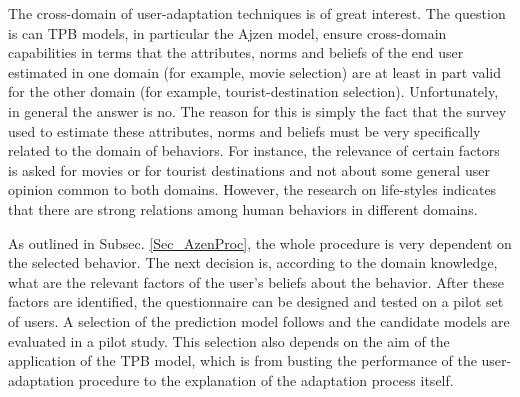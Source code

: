 \documentclass{llncs}
\begin{document}
\vspace{0.6em}
 The cross-domain of user-adaptation techniques is of great interest. The question is can TPB models, in particular the Ajzen model, ensure cross-domain capabilities in terms that the attributes, norms and beliefs of the end user estimated in one domain (for example, movie selection) are at least in part valid for the other domain (for example, tourist-destination selection). Unfortunately, in general the answer is no. The reason for this is simply the fact that the survey used to estimate these attributes, norms and beliefs must be very specifically related to the domain of behaviors. For instance, the relevance of certain factors is asked for movies or for tourist destinations and not about some general user opinion common to both domains. However, the research on life-styles \cite{Stadtmueller2013} \cite{Dewberry2013} indicates that there are strong relations among human behaviors in different domains.

\vspace{0.6em}
 As outlined in Subsec. \ref{Sec_AzenProc}, the whole procedure is very dependent on the selected behavior. The next decision is, according to the domain knowledge, what are the relevant factors of the user’s beliefs about the behavior. After these factors are identified, the questionnaire can be designed and tested on a pilot set of users. A selection of the prediction model follows and the candidate models are evaluated in a pilot study. This selection also depends on the aim of the application of the TPB model, which is from busting the performance of the user-adaptation procedure to the explanation of the adaptation process itself.
\end{document}
